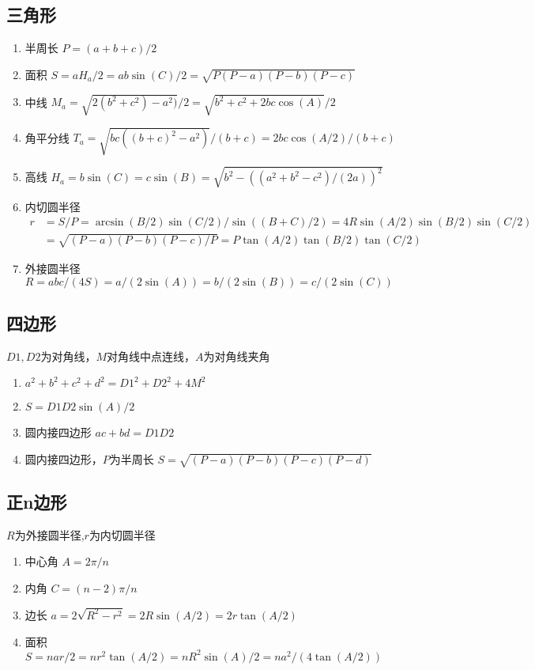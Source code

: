 \subsection*{三角形}
\begin{enumerate}
	\item 半周长
			$P=(a+b+c)/2$
	\item 面积
			$S=aH_a/2=ab\sin(C)/2=\sqrt{P(P-a)(P-b)(P-c)}$
	\item 中线
		$M_a=\sqrt{2(b^2+c^2)-a^2)}/2=\sqrt{b^2+c^2+2bc\cos(A)}/2$
	\item 角平分线 
		$T_a=\sqrt{bc((b+c)^2-a^2)}/(b+c)=2bc\cos(A/2)/(b+c)$
	\item 高线
		$H_a=b\sin(C)=c\sin(B)=\sqrt{b^2-((a^2+b^2-c^2)/(2a))^2}$
	\item 内切圆半径
		\begin{align*}
			r&=S/P=\arcsin(B/2)\sin(C/2)/\sin((B+C)/2)=4R\sin(A/2)\sin(B/2)\sin(C/2)\\
			&=\sqrt{(P-a)(P-b)(P-c)/P}=P\tan(A/2)\tan(B/2)\tan(C/2)
		\end{align*}
	\item 外接圆半径
		$R=abc/(4S)=a/(2\sin(A))=b/(2\sin(B))=c/(2\sin(C))$
\end{enumerate}

\subsection*{四边形}
	$D1,D2$为对角线，$M$对角线中点连线，$A$为对角线夹角
	\begin{enumerate}
		\item $a^2+b^2+c^2+d^2=D1^2+D2^2+4M^2$
		\item $S=D1D2\sin(A)/2$
		\item 圆内接四边形 $ac+bd=D1D2$
		\item 圆内接四边形，$P$为半周长 $S=\sqrt{(P-a)(P-b)(P-c)(P-d)}$
	\end{enumerate}

\subsection*{正n边形}
	$R$为外接圆半径,$r$为内切圆半径
	\begin{enumerate}
		\item 中心角 $A=2\pi/n$
		\item 内角 $C=(n-2)\pi/n$
		\item 边长 $a=2\sqrt{R^2-r^2}=2R\sin(A/2)=2r\tan(A/2)$
		\item 面积 $S=nar/2=nr^2\tan(A/2)=nR^2\sin(A)/2=na^2/(4\tan(A/2))$
	\end{enumerate}

